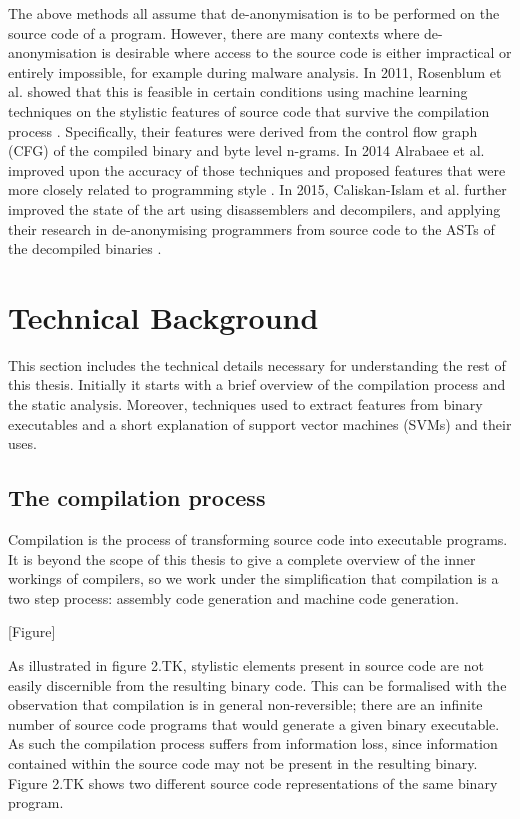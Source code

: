 \documentclass[a4paper,11pt]{kth-mag}
\begin{document}
The above methods all assume that de-anonymisation is to be performed on the
source code of a program. However, there are many contexts where
de-anonymisation is desirable where access to the source code is either
impractical or entirely impossible, for example during malware analysis. In
2011, Rosenblum et al. showed that this is feasible in certain conditions
using machine learning techniques on the stylistic features of source code that
survive the compilation process \parencite{rosenblum2011wrote}. Specifically,
their features were derived from the control flow graph (CFG) of the compiled
binary and byte level n-grams. In 2014 Alrabaee et al. improved upon the
accuracy of those techniques and proposed features that were more closely
related to programming style \parencite{alrabaee2014oba2}. In 2015,
Caliskan-Islam et al. further improved the state of the art using disassemblers
and decompilers, and applying their research in de-anonymising programmers from
source code to the ASTs of the decompiled binaries
\parencite{caliskan2015coding}.

\section{Technical Background}
This section includes the technical details necessary for understanding the
rest of this thesis. Initially it starts with a brief overview of the compilation process
and the static analysis. Moreover, techniques used to extract features from binary
executables and a short explanation of support vector machines (SVMs) and their
uses. 

\subsection{The compilation process}
Compilation is the process of transforming source code into executable
programs. It is beyond the scope of this thesis to give a complete overview of
the inner workings of compilers, so we work under the simplification that
compilation is a two step process: assembly code generation and machine code
generation.

[Figure]

As illustrated in figure 2.TK, stylistic elements present in source code are
not easily discernible from the resulting binary code. This can be formalised
with the observation that compilation is in general non-reversible; there are
an infinite number of source code programs that would generate a given binary
executable. As such the compilation process suffers from information loss,
since information contained within the source code may not be present in the
resulting binary. Figure 2.TK shows two different source code representations
of the same binary program.
\end{document}
